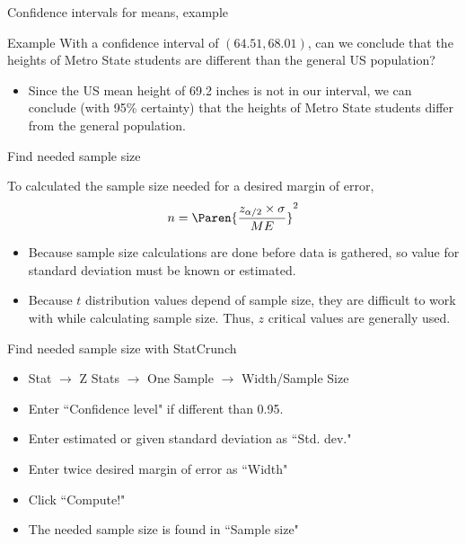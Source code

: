 \documentclass[xcolor=table, handout]{beamer}
\begin{document}
\begin{frame}{Confidence intervals for means, example}
\begin{exampleblock}{Example}
With a confidence interval of $(64.51, 68.01)$, can we conclude that the heights of Metro State students are different than the general US population?
\begin{itemize}
\pause\item Since the US mean height of 69.2 inches is not in our interval, we can conclude (with 95\% certainty) that the heights of Metro State students differ from the general population.
\end{itemize}
\end{exampleblock}
\end{frame}


\begin{frame}{Find needed sample size}
\begin{block}{}
\large
To calculated the sample size needed for a desired margin of error,
\[n = \Paren{\frac{z_{\alpha/2} \times \sigma}{ME}}^2\]
\begin{itemize}
\pause\item Because sample size calculations are done before data is gathered, so value for standard deviation must be known or estimated.
\pause\item Because $t$ distribution values depend of sample size, they are difficult to work with while calculating sample size. Thus, $z$ critical values are generally used.
\end{itemize}
\end{block}
\end{frame}

\begin{frame}{Find needed sample size with StatCrunch}
\begin{block}{}
\begin{itemize}
\item Stat $\to$ Z Stats $\to$ One Sample $\to$ Width/Sample Size
\item Enter ``Confidence level" if different than 0.95.
\item Enter estimated or given standard deviation as ``Std. dev."
\item Enter twice desired margin of error as ``Width" 
\item Click ``Compute!"
\item The needed sample size is found in ``Sample size"
\end{itemize}
\end{block}

\end{frame}
\end{document}
